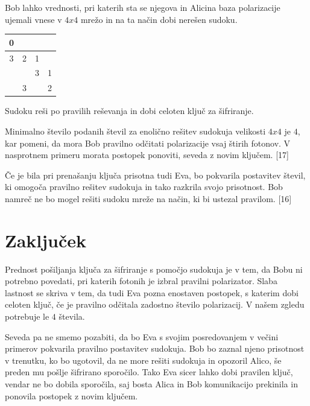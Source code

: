 \documentclass[A4paper, 11pt]{article}
\begin{document}
Bob lahko vrednosti, pri katerih sta se njegova in Alicina baza polarizacije ujemali vnese v $4x4$ mrežo in na ta način dobi nerešen sudoku.

\begin{center}
\begin{tabular}{| c | c || c | c |}
\hline
0 & & & \\
\hline
3 & 2 & 1 & \\
\hline
\hline
& & 3 & 1\\
\hline
& 3 & & 2\\
\hline
\end{tabular}
\end{center}

Sudoku reši po pravilih reševanja in dobi celoten ključ za šifriranje.

Minimalno število podanih števil za enolično rešitev sudokuja velikosti $4x4$ je $4$, kar pomeni, da mora Bob pravilno odčitati polarizacije vsaj štirih fotonov. V nasprotnem primeru morata postopek ponoviti, seveda z novim ključem. [17]

Če je bila pri prenašanju ključa prisotna tudi Eva, bo pokvarila postavitev števil, ki omogoča pravilno rešitev sudokuja in tako razkrila svojo prisotnost. Bob namreč ne bo mogel rešiti sudoku mreže na način, ki bi ustezal pravilom. [16]

\pagebreak


\section{Zaključek}

Prednost pošiljanja ključa za šifriranje s pomočjo sudokuja je v tem, da Bobu ni potrebno povedati, pri katerih fotonih je izbral pravilni polarizator. Slaba lastnost se skriva v tem, da tudi Eva pozna enostaven postopek, s katerim dobi celoten ključ, če je pravilno odčitala zadostno število polarizacij. V našem zgledu potrebuje le $4$ števila.

Seveda pa ne smemo pozabiti, da bo Eva s svojim posredovanjem v večini primerov pokvarila pravilno postavitev sudokuja. Bob bo zaznal njeno prisotnost v trenutku, ko bo ugotovil, da ne more rešiti sudokuja in opozoril Alico, še preden mu pošlje šifrirano sporočilo. Tako Eva sicer lahko dobi pravilen ključ, vendar ne bo dobila sporočila, saj bosta Alica in Bob komunikacijo prekinila in ponovila postopek z novim ključem. 


\end{document}
